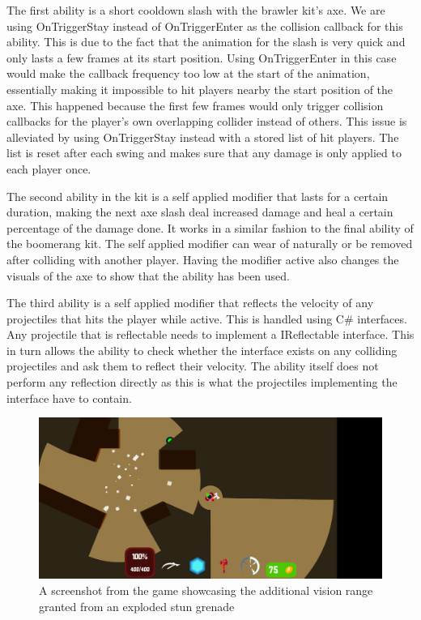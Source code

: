 The first ability is a short cooldown slash with the brawler kit's axe. We are using OnTriggerStay instead of OnTriggerEnter as the collision callback for this ability. This is due to the fact that the animation for the slash is very quick and only lasts a few frames at its start position. Using OnTriggerEnter in this case would make the callback frequency too low at the start of the animation, essentially making it impossible to hit players nearby the start position of the axe. This happened because the first few frames would only trigger collision callbacks for the player's own overlapping collider instead of others. 
This issue is alleviated by using OnTriggerStay instead with a stored list of hit players. The list is reset after each swing and makes sure that any damage is only applied to each player once. 

The second ability in the kit is a self applied modifier that lasts for a certain duration, making the next axe slash deal increased damage and heal a certain percentage of the damage done. It works in a similar fashion to the final ability of the boomerang kit. The self applied modifier can wear of naturally or be removed after colliding with another player. Having the modifier active also changes the visuals of the axe to show that the ability has been used. 

The third ability is a self applied modifier that reflects the velocity of any projectiles that hits the player while active. This is handled using C\# interfaces. Any projectile that is reflectable needs to implement a IReflectable interface. This in turn allows the ability to check whether the interface exists on any colliding projectiles and ask them to reflect their velocity. The ability itself does not perform any reflection directly as this is what the projectiles implementing the interface have to contain.

\begin{figure}[tbph]  %
  \centering
  \includegraphics[width=.75\textwidth]{images/stunGrenade}
  \caption[Screenshot of the brawler kit's stun grenade]{A screenshot from the game showcasing the additional vision range granted from an exploded stun grenade}
  \label{fig:brawlerStunGrenade}
\end{figure}

